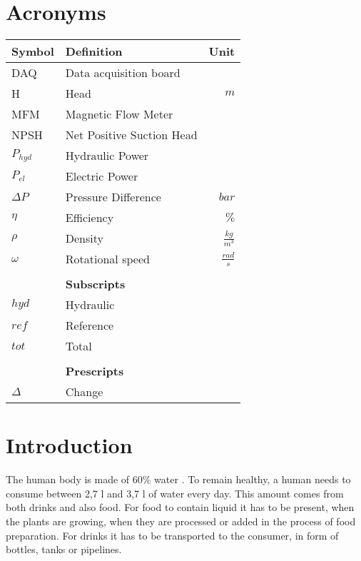\chapter*{Acronyms}
\begin{tabular*}{\textwidth}{@{\extracolsep{\fill}} l l r}
	\hline
	\textbf{Symbol}	& \textbf{Definition}			& \textbf{Unit}\\
	\hline
	DAQ 		& Data acquisition board 			& \\
	H			& Head								& $m$\\
	MFM 		& Magnetic Flow Meter 				& \\
	NPSH		& Net Positive Suction Head 		& \\
	$P_{hyd}$	& Hydraulic Power					& \\
	$P_{el}$	& Electric Power					& \\

	$\Delta P$	& Pressure Difference				& $bar$\\
	$\eta$		& Efficiency						& $\%$\\
	$\rho$		& Density							& $\frac{kg}{m^3}$\\
	$\omega$	& Rotational speed					& $\frac{rad}{s}$\\
	\hline \hline
				& 									&	\\
				& \textbf{Subscripts}				&	\\
	\hline
	$hyd$		& Hydraulic							&	\\
	$ref$		& Reference							&	\\
	$tot$		& Total								&	\\
	\hline \hline
				& 									&	\\
				& \textbf{Prescripts}				&	\\
	\hline
	$\Delta$	& Change							&	\\
\end{tabular*}


\chapter{Introduction}\label{ch:introduction}
The human body is made of 60\% water \cite{HumanWater}.
To remain healthy,
a human needs to consume between 2,7 l and 3,7 l of water every day. \cite{DailyWater}
This amount comes from both drinks and also food.
For food to contain liquid it has to be present,
when the plants are growing,
when they are processed or added in the process of food preparation.
For drinks it has to be transported to the consumer,
in form of bottles, tanks or pipelines.

